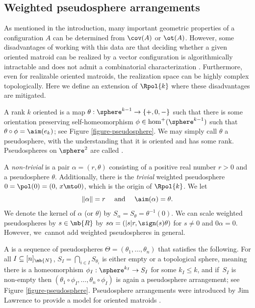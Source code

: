 \subsection{Weighted pseudosphere arrangements}\label{subsection-pseudosphere}

As mentioned in the introduction, many important geometric properties of a configuration $A$ can be determined from $\cov(A)$ or $\ot(A)$.
However, some disadvantages of working with this data are that deciding whether a given oriented matroid can be realized by a vector configuration is algorithmically intractable and does not admit a combinatorial characterization \cite{shor1991stretchability,vamos1978missing,mayhew2018yes}. Furthermore, even for realizable oriented matroids, the realization space can be highly complex topologically.
Here we define an extension of $\Rpol{k}$ where these disadvantages are mitigated.

A rank $k$ oriented  is a map $\theta : \sphere^{k-1} \to \{+,0,-\}$ such that there is some orientation preserving self-homeomorphism $\phi \in \hom^+(\sphere^{k-1})$ such that \hbox{$\theta \circ \phi = \aim (e_k)$}; see Figure \ref{figure-pseudosphere}.
We may simply call $\theta$ a pseudosphere, with the understanding that it is oriented and has some rank.
Pseudospheres on $\sphere^2$ are called .

A \emph{non-trivial}  is a pair $\alpha = (r,\theta)$ consisting of a positive real number $r>0$ and a pseudosphere $\theta$. Additionally, there is the \emph{trivial} weighted pseudosphere $0 =\pol(0) = (0,\, x \mto 0)$, which is the origin of $\Rpol{k}$.
We let
\[\|\alpha\| = r \quad \text{ and } \quad \aim (\alpha) = \theta.\]
We denote the kernel of $\alpha$ (or $\theta$) by $S_\alpha = S_\theta = \theta^{-1}(0)$.
We can scale weighted pseudospheres by $s \in \mb{R}$ by $s \alpha = (|s|r,\sign(s)\theta)$ for $s\neq 0$ and $0\alpha = 0$.
However, we~cannot add weighted pseudospheres in general.

A  is a sequence of pseudospheres $\Theta = (\theta_1,\dots,\theta_n)$ that satisfies the following.
For all $I \subseteq [n]_\mb{N}$,
$S_I = \bigcap_{i \in I} S_{\theta_i} $ is either empty or a topological sphere, meaning there is a homeomorphism $\phi_I : \sphere^{k_I} \to S_I$ for some $k_I \leq k$,
and if~$S_I$ is non-empty then $(\theta_1 \circ \phi_I,\dots, \theta_n \circ \phi_I)$ is again a pseudosphere arrangement; see Figure \ref{figure-pseudosphere}.
Pseudosphere arrangements were introduced by Jim Lawrence to provide a model for oriented matroids \cite{folkman1978oriented}.

